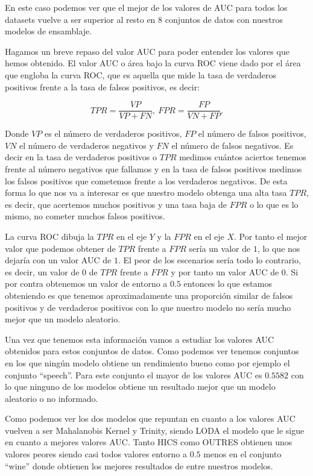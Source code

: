 \clearpage

En este caso podemos ver que el mejor de los valores de AUC para todos los datasets vuelve a ser superior al resto en 8 conjuntos de datos con nuestros modelos de ensamblaje.

Hagamos un breve repaso del valor AUC para poder entender los valores que hemos obtenido. El valor AUC o área bajo la curva ROC viene dado por el área que engloba la curva ROC, que es aquella que mide la tasa de verdaderos positivos frente a la tasa de falsos positivos, es decir:

$$TPR = \frac{VP}{VP + FN}, \ FPR = \frac{FP}{VN + FP}.$$

Donde $VP$ es el número de verdaderos positivos, $FP$ el número de falsos positivos, $VN$ el número de verdaderos negativos y $FN$ el número de falsos negativos. Es decir en la tasa de verdaderos positivos o $TPR$ medimos cuántos aciertos tenemos frente al número negativos que fallamos y en la tasa de falsos positivos medimos los falsos positivos que cometemos frente a los verdaderos negativos. De esta forma lo que nos va a interesar es que nuestro modelo obtenga una alta tasa $TPR$, es decir, que acertemos muchos positivos y una tasa baja de $FPR$ o lo que es lo mismo, no cometer muchos falsos positivos.

La curva ROC dibuja la $TPR$ en el eje $Y$ y la $FPR$ en el eje $X$. Por tanto el mejor valor que podemos obtener de $TPR$ frente a $FPR$ sería un valor de $1$, lo que nos dejaría con un valor AUC de $1$. El peor de los escenarios sería todo lo contrario, es decir, un valor de $0$ de $TPR$ frente a $FPR$ y por tanto un valor AUC de $0$. Si por contra obtenemos un valor de entorno a $0.5$ entonces lo que estamos obteniendo es que tenemos aproximadamente una proporción similar de falsos positivos y de verdaderos positivos con lo que nuestro modelo no sería mucho mejor que un modelo aleatorio.

Una vez que tenemos esta información vamos a estudiar los valores AUC obtenidos para estos conjuntos de datos. Como podemos ver tenemos conjuntos en los que ningún modelo obtiene un rendimiento bueno como por ejemplo el conjunto ``speech''. Para este conjunto el mayor de los valores AUC es $0.5582$ con lo que ninguno de los modelos obtiene un resultado mejor que un modelo aleatorio o no informado.

Como podemos ver los dos modelos que repuntan en cuanto a los valores AUC vuelven a ser Mahalanobis Kernel y Trinity, siendo LODA el modelo que le sigue en cuanto a mejores valores AUC. Tanto HICS como OUTRES obtienen unos valores peores siendo casi todos valores entorno a $0.5$ menos en el conjunto ``wine'' donde obtienen los mejores resultados de entre nuestros modelos.

